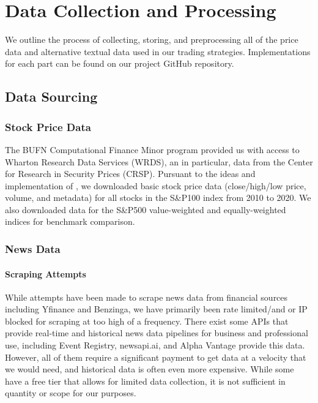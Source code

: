 \chapter{Data Collection and Processing}

We outline the process of collecting, storing, and preprocessing all of the price data and
alternative textual data used in our trading strategies.
Implementations for each part can be found on our project GitHub repository.

\section{Data Sourcing}

\subsection{Stock Price Data}
The BUFN Computational Finance Minor program provided us with access to Wharton Research Data Services (WRDS),
an in particular, data from the Center for Research in Security Prices (CRSP).
Pursuant to the ideas and implementation of \cite{drl_framework}, we downloaded basic stock price data (close/high/low price, volume, and metadata)
for all stocks in the S\&P100 index from 2010 to 2020. We also downloaded data for the S\&P500 value-weighted and equally-weighted indices for benchmark comparison.

\subsection{News Data}

\subsubsection{Scraping Attempts}
While attempts have been made to scrape news data from financial sources including Yfinance and Benzinga,
we have primarily been rate limited/and or IP blocked for scraping at too high of a frequency.
There exist some APIs that provide real-time and historical news data pipelines for business and professional 
use, including Event Registry, newsapi.ai, and Alpha Vantage provide 
this data. However, all of them require a significant payment to get data at a velocity 
that we would need, and historical data is often even more expensive.
While some have a free tier that allows for limited data collection, it is not sufficient
in quantity or scope for our purposes.

